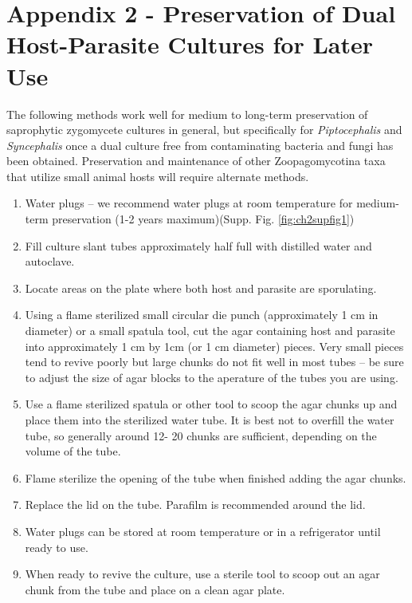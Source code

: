 \documentclass[]{book}
\begin{document}
\section{Appendix 2 - Preservation of Dual Host-Parasite Cultures for
Later
Use}\label{appendix-2---preservation-of-dual-host-parasite-cultures-for-later-use}

The following methods work well for medium to long-term preservation of
saprophytic zygomycete cultures in general, but specifically for
\emph{Piptocephalis} and \emph{Syncephalis} once a dual culture free
from contaminating bacteria and fungi has been obtained. Preservation
and maintenance of other Zoopagomycotina taxa that utilize small animal
hosts will require alternate methods.

\begin{enumerate}
\def\labelenumi{\arabic{enumi}.}
\item
  {Water plugs -- we recommend water plugs at room temperature for
  medium-term preservation (1-2 years maximum)}(Supp. Fig.
  \ref{fig:ch2supfig1})
\item
  Fill culture slant tubes approximately half full with distilled water
  and autoclave.
\item
  Locate areas on the plate where both host and parasite are
  sporulating.
\item
  Using a flame sterilized small circular die punch (approximately 1 cm
  in diameter) or a small spatula tool, cut the agar containing host and
  parasite into approximately 1 cm by 1cm (or 1 cm diameter) pieces.
  Very small pieces tend to revive poorly but large chunks do not fit
  well in most tubes -- be sure to adjust the size of agar blocks to the
  aperature of the tubes you are using.
\item
  Use a flame sterilized spatula or other tool to scoop the agar chunks
  up and place them into the sterilized water tube. It is best not to
  overfill the water tube, so generally around 12- 20 chunks are
  sufficient, depending on the volume of the tube.
\item
  Flame sterilize the opening of the tube when finished adding the agar
  chunks.
\item
  Replace the lid on the tube. Parafilm is recommended around the lid.
\item
  Water plugs can be stored at room temperature or in a refrigerator
  until ready to use.
\item
  When ready to revive the culture, use a sterile tool to scoop out an
  agar chunk from the tube and place on a clean agar plate.

\end{enumerate}
\end{document}
